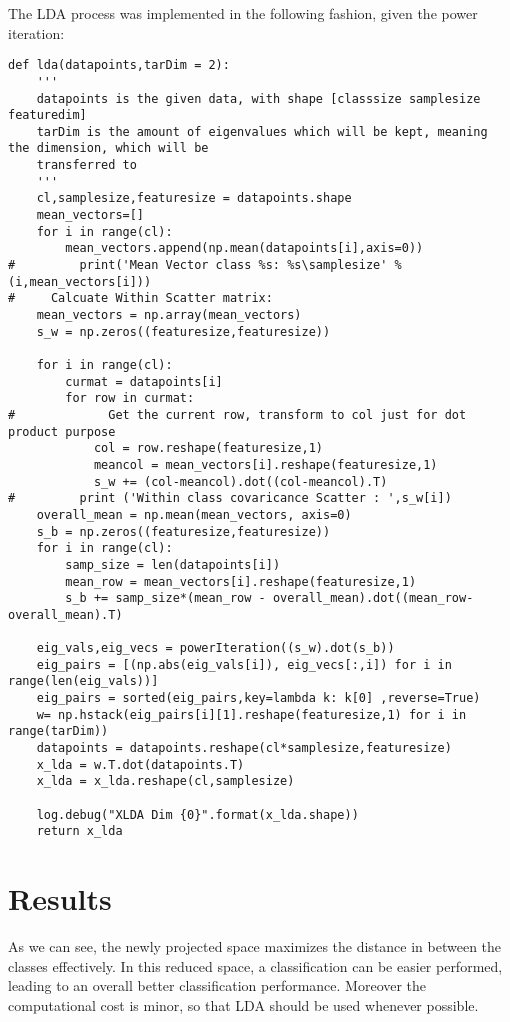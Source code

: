 The LDA process was implemented in the following fashion, given the power iteration:
\begin{verbatim}
def lda(datapoints,tarDim = 2):
    '''
    datapoints is the given data, with shape [classsize samplesize featuredim]
    tarDim is the amount of eigenvalues which will be kept, meaning the dimension, which will be 
    transferred to
    '''
    cl,samplesize,featuresize = datapoints.shape
    mean_vectors=[]
    for i in range(cl):
        mean_vectors.append(np.mean(datapoints[i],axis=0))
#         print('Mean Vector class %s: %s\samplesize' % (i,mean_vectors[i]))
#     Calcuate Within Scatter matrix:
    mean_vectors = np.array(mean_vectors)
    s_w = np.zeros((featuresize,featuresize))
    
    for i in range(cl):
        curmat = datapoints[i]
        for row in curmat:
#             Get the current row, transform to col just for dot product purpose
            col = row.reshape(featuresize,1)
            meancol = mean_vectors[i].reshape(featuresize,1)
            s_w += (col-meancol).dot((col-meancol).T)
#         print ('Within class covaricance Scatter : ',s_w[i])
    overall_mean = np.mean(mean_vectors, axis=0)
    s_b = np.zeros((featuresize,featuresize))
    for i in range(cl):
        samp_size = len(datapoints[i])
        mean_row = mean_vectors[i].reshape(featuresize,1)
        s_b += samp_size*(mean_row - overall_mean).dot((mean_row-overall_mean).T)
    
    eig_vals,eig_vecs = powerIteration((s_w).dot(s_b))
    eig_pairs = [(np.abs(eig_vals[i]), eig_vecs[:,i]) for i in range(len(eig_vals))]
    eig_pairs = sorted(eig_pairs,key=lambda k: k[0] ,reverse=True)
    w= np.hstack(eig_pairs[i][1].reshape(featuresize,1) for i in range(tarDim))
    datapoints = datapoints.reshape(cl*samplesize,featuresize)
    x_lda = w.T.dot(datapoints.T)
    x_lda = x_lda.reshape(cl,samplesize)
    
    log.debug("XLDA Dim {0}".format(x_lda.shape))
    return x_lda
\end{verbatim}



\section{Results}

As we can see, the newly projected space maximizes the distance in between the classes effectively. In this reduced space, a classification can be easier performed, leading to an overall better classification performance. Moreover the computational cost is minor, so that LDA should be used whenever possible.

